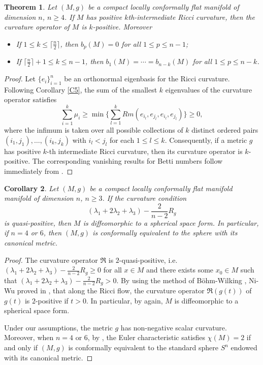 \documentclass[12pt, twoside]{article}
\newtheorem{theorem}{Theorem}[section]
\newtheorem{corollary}[theorem]{Corollary}
\theoremstyle{definition}
\numberwithin{equation}{section}
\def \la {\lambda}
\begin{document}
\begin{theorem}
Let $(M,g)$ be a compact locally conformally flat manifold of dimension $n$, $n\geq4$. If $M$ has positive $k$th-intermediate
Ricci curvature, then the curvature operator of $M$ is $k$-positive. Moreover
	\begin{itemize}
		\item [(1)]If $1\leq k\leq \lceil\frac{n}{2}\rceil$, then $b_{p}(M)=0$ for all $1\leq p\leq n-1$;
		\item [(2)] If $ \lceil\frac{n}{2}\rceil+1\leq k\leq n-1$, then 
		$b_{1}(M)=\cdots=b_{n-k}(M)$ for all $1\leq p\leq n-k$.
	\end{itemize}
\end{theorem}
\begin{proof}
Let $\{e_{i}\}_{i=1}^n$ be an orthonormal eigenbasis for the Ricci curvature. Following Corollary \ref{C5}, the sum of the smallest $k$ eigenvalues of the curvature operator satisfies
$$\sum_{i=1}^k\mu_i\geq\min\{\sum_{l=1}^{k}Rm(e_{i_{l}},e_{j_{l}},e_{i_{l}},e_{j_{l}} )\}\geq 0,$$
where the infimum is taken over all possible collections of $k$ distinct ordered pairs $(i_1,j_1), \dots, (i_k,j_k)$ with $i_l < j_l$ for each $1 \leq l \leq k$. Consequently, if a metric $g$ has positive $k$-th intermediate Ricci curvature, then its curvature operator is $k$-positive. The corresponding vanishing results for Betti numbers follow immediately from \cite[Theorem A]{PW21a}.
\end{proof}

\begin{corollary}
	Let $(M,g)$ be a compact locally conformally flat manifold manifold of dimension $n$, $n\geq3$. If the curvature condition
	 $$(\la_{1}+2\la_{2}+\la_{3})-\frac{2}{n-2}R_{g}$$ is quasi-positive, then 
	$M$ is diffeomorphic to a spherical space form. In particular, if $n=4$ or $6$, then $(M,g)$ is conformally equivalent to the sphere with its canonical metric.
\end{corollary}
\begin{proof}
	The curvature operator $\mathfrak{R}$ is $2$-quasi-positive, i.e. $(\la_{1}+2\la_{2}+\la_{3})-\frac{2}{n-2}R_{g}\geq 0$ for all $x\in M$ and there exists some $x_{0}\in M$ such that $(\la_{1}+2\la_{2}+\la_{3})-\frac{2}{n-2}R_{g}>0$. By using the method of B\"{o}hm-Wilking \cite{BW08}, Ni-Wu proved in \cite[Corollary 2.3]{NW07}, that along the Ricci flow, the curvature operator $\mathfrak{R}(g(t))$ of $g(t)$ is $2$-positive if $t>0$. In particular, by \cite{BW08} again, $M$ is diffeomorphic to a spherical
	space form.
	
Under our assumptions, the metric $g$ has non-negative scalar curvature. Moreover, when $n=4$ or $6$, by \cite[Theorem A]{Gur94}, the Euler characteristic satisfies $\chi(M)=2$ if and only if $(M,g)$ is conformally equivalent to the standard sphere $S^{n}$ endowed with its canonical metric.
\end{proof}
\end{document}
